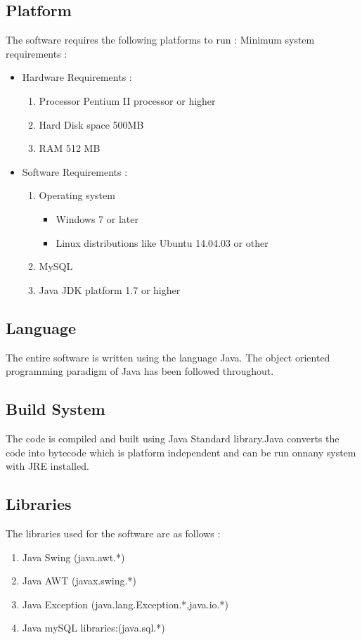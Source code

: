 \documentclass[a4paper]{article}
\begin{document}
\subsection{Platform}
The software requires the following platforms to run :
Minimum system requirements :
\begin{itemize}
\item Hardware Requirements :
	\begin {enumerate}
	\item Processor Pentium II processor or higher
	\item Hard Disk space 500MB
	\item RAM 512 MB
	\end{enumerate}
\item Software Requirements :
	\begin{enumerate}
	\item Operating system
		\begin{itemize}
		\item  Windows 7 or later
		\item Linux distributions like Ubuntu 14.04.03 or other
		\end{itemize}
	\item MySQL
	\item Java JDK platform 1.7 or higher
	\end{enumerate}
\end {itemize}
\subsection{Language}
The entire software is written using the language Java.
The object oriented programming paradigm of Java has been followed throughout.
\subsection{Build System}
The code is compiled and built using Java Standard library.Java converts the code into bytecode which is platform independent and can be run onnany system with JRE installed.

\subsection{Libraries}
The libraries used for the software are as follows :

\begin{enumerate}
\item Java Swing (java.awt.*)
\item Java AWT   (javax.swing.*)
\item Java Exception  (java.lang.Exception.*,java.io.*)
\item Java mySQL libraries:(java.sql.*)
\end{enumerate}
\end{document}
